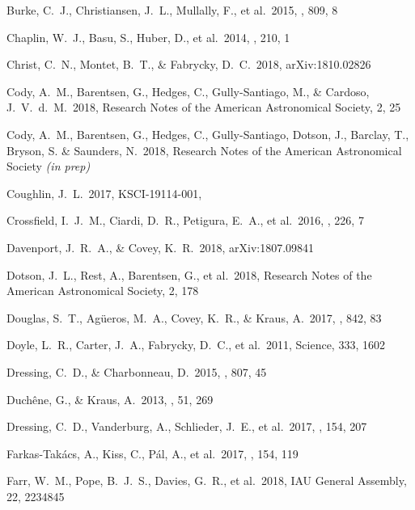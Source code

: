 \documentclass[modern]{aastex62}
\begin{document}
\begin{thebibliography}{}
 Burke, C.~J., Christiansen, J.~L., Mullally, F., et al.\ 2015, \apj, 809, 8 

 Chaplin, W.~J., Basu, S., Huber, D., et al.\ 2014, \apjs, 210, 1 

 Christ, C.~N., Montet, B.~T., \& Fabrycky, D.~C.\ 2018, arXiv:1810.02826 

 Cody, A.~M., Barentsen, G., Hedges, C., Gully-Santiago, M., \& Cardoso, J.~V.~d.~M.\ 2018, Research Notes of the American Astronomical Society, 2, 25 

 Cody, A.~M., Barentsen, G., Hedges, C., Gully-Santiago, Dotson, J., Barclay, T., Bryson, S. \& Saunders, N.\ 2018, Research Notes of the American Astronomical Society \emph{(in prep)}

 Coughlin, J.~L.\ 2017, KSCI-19114-001,  

 Crossfield, I.~J.~M., Ciardi, D.~R., Petigura, E.~A., et al.\ 2016, \apjs, 226, 7 

 Davenport, J.~R.~A., \& Covey, K.~R.\ 2018, arXiv:1807.09841 

 Dotson, J.~L., Rest, A., Barentsen, G., et al.\ 2018, Research Notes of the American Astronomical Society, 2, 178 

 Douglas, S.~T., Ag{\"u}eros, M.~A., Covey, K.~R., \& Kraus, A.\ 2017, \apj, 842, 83 

 Doyle, L.~R., Carter, J.~A., Fabrycky, D.~C., et al.\ 2011, Science, 333, 1602 

 Dressing, C.~D., \& Charbonneau, D.\ 2015, \apj, 807, 45 

 Duch{\^e}ne, G., \& Kraus, A.\ 2013, \araa, 51, 269 

 Dressing, C.~D., Vanderburg, A., Schlieder, J.~E., et al.\ 2017, \aj, 154, 207 

 Farkas-Tak{\'a}cs, A., Kiss, C., P{\'a}l, A., et al.\ 2017, \aj, 154, 119 

 Farr, W.~M., Pope, B.~J.~S., Davies, G.~R., et al.\ 2018, IAU General Assembly, 22, 2234845 


\end{thebibliography}
\end{document}
